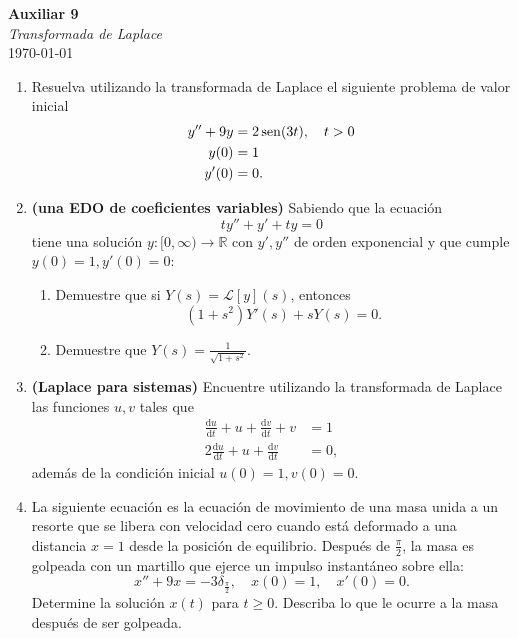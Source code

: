 \documentclass{article}
\begin{document}


\begin{center}
    \Huge{\textbf{Auxiliar 9}}\\
\textit{\large{Transformada de Laplace}}\\
    \normalsize
    \today
\end{center}

\begin{enumerate}
	\item Resuelva utilizando la transformada de Laplace el siguiente problema de valor inicial
\begin{align*}
y'' + 9y &= 2\operatorname{sen}(3t), \quad t > 0 \\
y(0) &= 1 \\
y'(0) &= 0.
\end{align*}
\item \textbf{(una EDO de coeficientes variables)} Sabiendo que la ecuación
$$
	ty'' + y' + ty = 0
$$
tiene una solución $y: [0, \infty) \to \mathbb{R}$ con $y', y''$ de orden exponencial y que cumple $y(0) = 1, y'(0) = 0$:
\begin{enumerate}
	\item Demuestre que si $Y(s) = \mathcal{L}[y](s)$, entonces
$$
	(1+s^2)Y'(s) + sY(s) = 0.
$$
\item Demuestre que $Y(s) = \frac{1}{\sqrt{1+s^2}}$.
\end{enumerate}
\item \textbf{(Laplace para sistemas)} Encuentre utilizando la transformada de Laplace las funciones $u, v$ tales que
\begin{align*}
\frac{\mathrm{d} u}{\mathrm{d} t} + u + \frac{\mathrm{d} v}{\mathrm{d} t} + v &= 1 \\
2 \frac{\mathrm{d} u}{\mathrm{d} t} + u + \frac{\mathrm{d} v}{\mathrm{d} t} &= 0,
\end{align*}
además de la condición inicial $u(0) = 1, v(0) = 0$.
\item La siguiente ecuación es la ecuación de movimiento de una masa unida a un resorte que se libera con velocidad cero cuando está deformado a una distancia $x=1$ desde la posición de equilibrio. Después de $\frac{\pi}{2}$, la masa es golpeada con un martillo que ejerce un impulso instantáneo sobre ella:
$$
	x'' + 9x = -3 \delta_{ \frac{\pi}{2} }, \quad x(0) = 1, \quad x'(0)=0.
$$
Determine la solución $x(t)$ para $t \geq 0$. Describa lo que le ocurre a la masa después de ser golpeada.

\end{enumerate}
\end{document}
